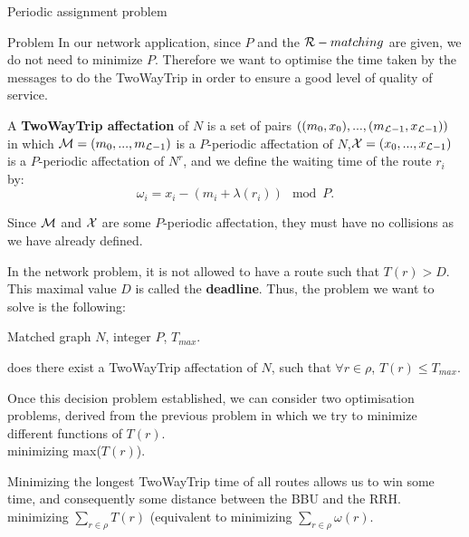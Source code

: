 \documentclass[a4paper,10pt]{report}
\begin{document}
\begin{chapter}{Periodic assignment problem}
\begin{section}{Problem}
In our network application, since $P$ and the ${\cal R}-matching$ are given, we do not need to minimize $P$.
Therefore we want to optimise the time taken by the messages to do the TwoWayTrip in order to ensure a good level of quality of service.

A {\bf TwoWayTrip affectation} of $N$ is a set of pairs $ ((m_0,x_0),...,(m_{{\cal L}-1},x_{{\cal L}-1}))$ in which ${\cal M} = (m_0,...,m_{{\cal L}-1})$ 
is a $P$-periodic affectation of $N$,${\cal X} = (x_0,...,x_{{\cal L}-1})$ is a $P$-periodic affectation of $N^r$, and we define the waiting time of the route $r_i$ by:
$$ \omega_i = x_i - (m_i + \lambda(r_i)) \mod P .$$ 

Since ${\cal M}$ and ${\cal X}$ are some $P$-periodic affectation, they must have no collisions as we have already defined.



In the network problem, it is not allowed to have a route such that $T(r) > D$. This maximal value $D$ is called the {\bf deadline}.
Thus, the problem we want to solve is the following:\\


 Matched graph $N$, integer $P$, $ T_{max}$.

 does there exist a TwoWayTrip affectation of $N$, such that $\forall r \in \rho$, $T(r) \le T_{max}$.

Once this decision problem established, we can consider two optimisation problems, derived from the previous problem in which
we try to minimize different functions of $T(r)$.\\

 minimizing max($T(r)$).

Minimizing the longest TwoWayTrip time of all routes allows us to win some time, and consequently some distance between the BBU and the RRH.\\

 minimizing $\sum_{r \in \rho}  T(r)$ (equivalent to minimizing $\sum_{r \in \rho}  \omega(r)$.


\end{section}
\end{chapter}
\end{document}
